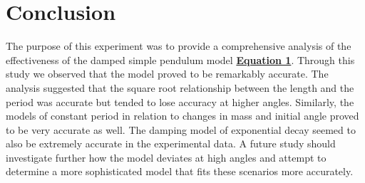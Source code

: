 \documentclass[
	letterpaper
	12pt
]{template}
\newcommand{\bref}[2]{\textbf{\hyperref[#1]{#2}}}
\begin{document}
\section{Conclusion}
The purpose of this experiment was to provide a comprehensive analysis of the effectiveness of the damped simple pendulum model \bref{eqn::oscillatorEqn}{Equation 1}. Through this study we observed that the model proved to be remarkably accurate. The analysis suggested that the square root relationship between the length and the period was accurate but tended to lose accuracy at higher angles. Similarly, the models of constant period in relation to changes in mass and initial angle proved to be very accurate as well. The damping model of exponential decay seemed to also be extremely accurate in the experimental data. A future study should investigate further how the model deviates at high angles and attempt to determine a more sophisticated model that fits these scenarios more accurately.


\end{document}
